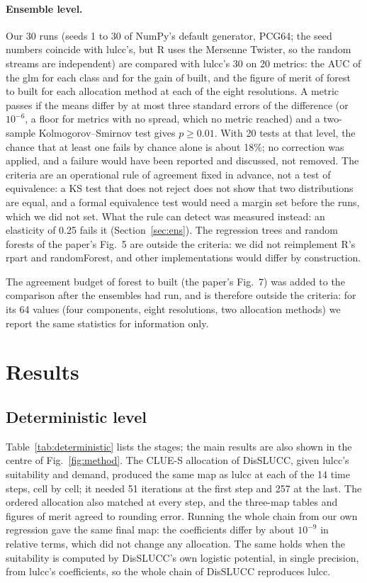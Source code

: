 \paragraph{Ensemble level.} Our 30 runs (seeds 1 to 30 of NumPy's default generator, PCG64; the seed numbers
coincide with lulcc's, but R uses the Mersenne Twister, so the random streams are
independent) are
compared with lulcc's 30 on 20 metrics: the AUC of the glm for each class and for the
gain of built, and the figure of merit of forest to built for each allocation method at
each of the eight resolutions. A metric passes if the means differ by at most three standard errors of the difference
(or $10^{-6}$, a floor for metrics with no spread, which no metric reached) and a
two-sample Kolmogorov--Smirnov test gives $p \geq 0.01$. With 20 tests at that level,
the chance that at least one fails by chance alone is about 18\%; no correction was
applied, and a failure would have been reported and discussed, not removed. The
criteria are an operational rule of agreement fixed in advance, not a test of
equivalence: a KS test that does not reject does not show that two distributions are
equal, and a formal equivalence test would need a margin set before the runs, which we
did not set. What the rule can detect was measured instead: an elasticity of 0.25 fails
it (Section~\ref{sec:ens}). The regression trees and random forests of the paper's Fig.~5 are
outside the criteria: we did not reimplement R's rpart and randomForest, and other
implementations would differ by construction.

The agreement budget of forest to built (the paper's Fig.~7) was added to the comparison
after the ensembles had run, and is therefore outside the criteria: for its 64 values
(four components, eight resolutions, two allocation methods) we report the same
statistics for information only.

\section{Results}

\subsection{Deterministic level}
\label{sec:det}

Table~\ref{tab:deterministic} lists the stages; the main results are also shown in the centre
of Fig.~\ref{fig:method}. The CLUE-S allocation of DisSLUCC,
given lulcc's suitability and demand, produced the same map as lulcc at each of the
14 time steps, cell by cell; it needed 51 iterations at the first step and 257 at the
last. The ordered allocation also matched at every step, and the three-map tables and
figures of merit agreed to rounding error. Running the whole chain from our own
regression gave the same final map: the coefficients differ by about $10^{-9}$ in
relative terms, which did not change any allocation. The same holds when the suitability
is computed by DisSLUCC's own logistic potential, in single precision, from lulcc's
coefficients, so the whole chain of DisSLUCC reproduces lulcc.

